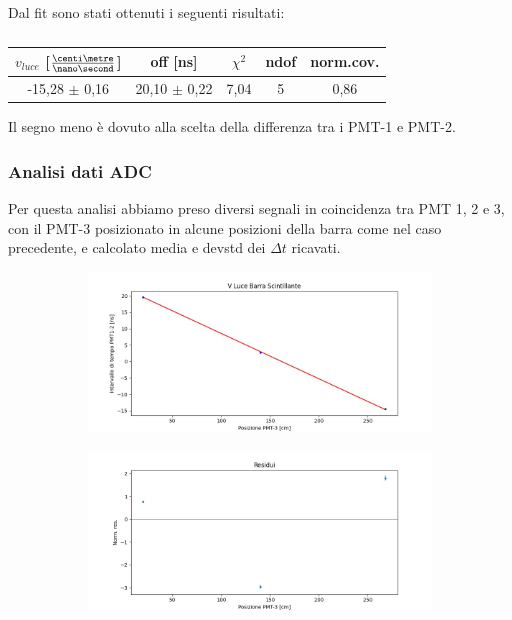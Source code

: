 \documentclass[a4paper,twocolumn]{article}
\begin{document}
Dal fit sono stati ottenuti i seguenti risultati:

\begin{table}[H]
\begin{tabular}{|c|c|c|c|c|}
\hline
$v_{luce}$ [$\frac{\centi\metre}{\nano\second}$] & off [ns] & $\chi ^2$ & ndof & norm.cov. \\
\hline
-15,28 $\pm$ 0,16 & 20,10 $\pm$ 0,22& 7,04 & 5 & 0,86\\
\hline
\end{tabular}
\caption{}
\label{tab:ResFitVLOsc}
\end{table}

Il segno meno è dovuto alla scelta della differenza tra i PMT-1 e PMT-2.

\subsubsection{Analisi dati ADC}
\label{sec:VBarADC}
Per questa analisi abbiamo preso diversi segnali in coincidenza tra PMT 1, 2 e 3, con il PMT-3 posizionato in alcune posizioni della barra come nel caso precedente, e calcolato media e devstd dei $\Delta t$ ricavati.

\begin{figure}[H]
     \begin{subfigure}[b]{0.47\textwidth}
         \centering
         \includegraphics[width=\textwidth]{./immagini/TimeOfFlight/VLightBarraADC}
         \caption{}
         \label{fig:FitVLightBarraADC}
     \end{subfigure}
     \hfill
     \begin{subfigure}[b]{0.47\textwidth}
         \centering
         \includegraphics[width=\textwidth]{./immagini/TimeOfFlight/ResVLightBarraADC}
         \caption{}
         \label{fig:ResVLIghtBarraADC}
     \end{subfigure}
     \caption{}        
     \label{fig:FitLinVLightBarraADC}
\end{figure}
\end{document}
